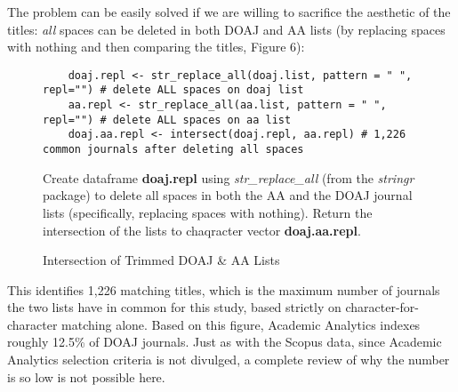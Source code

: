 \documentclass{article}
\begin{document}
The problem can be easily solved if we are willing to sacrifice the aesthetic of the titles: \emph{all} spaces can be deleted in both DOAJ and AA  lists (by replacing spaces with nothing and then comparing the titles, Figure 6):
\begin{figure}[htpb]
	\centering
	\caption{Intersection of Trimmed DOAJ \& AA Lists}
	\begin{lstlisting}
	doaj.repl <- str_replace_all(doaj.list, pattern = " ", repl="") # delete ALL spaces on doaj list
	aa.repl <- str_replace_all(aa.list, pattern = " ", repl="") # delete ALL spaces on aa list
	doaj.aa.repl <- intersect(doaj.repl, aa.repl) # 1,226 common journals after deleting all spaces
	\end{lstlisting}
	\footnotesize{
		Create dataframe \textbf{doaj.repl} using \textit{str\_replace\_all} (from the \textit{stringr} package) to delete all spaces in both the AA and the DOAJ journal lists (specifically, replacing spaces with nothing). 
		Return the intersection of the lists to chaqracter vector \textbf{doaj.aa.repl}.
			}
\end{figure}
This identifies 1,226 matching titles, which is the maximum number of journals the two lists have in common for this study, based strictly on character-for-character matching alone.
Based on this figure, Academic Analytics indexes roughly 12.5\% of DOAJ journals.
Just as with the Scopus data, since Academic Analytics selection criteria is not divulged, a complete review of why the number is so low is not possible here.
\end{document}

